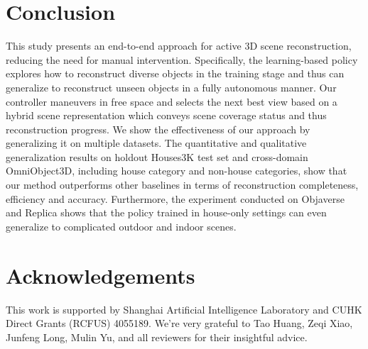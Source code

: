 \section{Conclusion}
\label{sec:conclusion}

This study presents an end-to-end approach for active 3D scene reconstruction, reducing the need for manual intervention. 
Specifically, the learning-based policy explores how to reconstruct diverse objects in the training stage and thus can generalize to reconstruct unseen objects in a fully autonomous manner.
Our controller maneuvers in free space and selects the next best view based on a hybrid scene representation which conveys scene coverage status and thus reconstruction progress. 
We show the effectiveness of our approach by generalizing it on multiple datasets. %
The quantitative and qualitative generalization results on holdout Houses3K test set and cross-domain OmniObject3D, including house category and non-house categories, show that our method outperforms other baselines in terms of reconstruction completeness, efficiency and accuracy. 
Furthermore, the experiment conducted on Objaverse and Replica shows that the policy trained in house-only settings can even generalize to complicated outdoor and indoor scenes.

\vspace{4pt}
\section*{Acknowledgements}
This work is supported by Shanghai Artificial Intelligence Laboratory and CUHK Direct Grants (RCFUS) 4055189. We're very grateful to Tao Huang, Zeqi Xiao, Junfeng Long, Mulin Yu, and all reviewers for their insightful advice.

\newpage